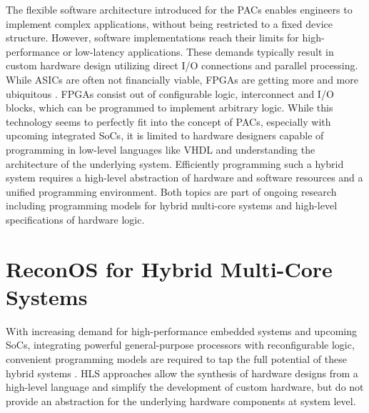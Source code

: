 The flexible software architecture introduced for the \acp{PAC} enables
engineers to implement complex applications, without being restricted to a
fixed device structure. However, software implementations reach their limits
for high-performance or low-latency applications. These demands typically
result in custom hardware design utilizing direct I/O connections and parallel
processing. While \acp{ASIC} are often not financially viable, \acp{FPGA} are
getting more and more ubiquitous \citep{VMB13}. \acp{FPGA} consist out of
configurable logic, interconnect and I/O blocks, which can be programmed to
implement arbitrary logic. While this technology seems to perfectly fit into
the concept of \acp{PAC}, especially with upcoming integrated \acp{SoC}, it is
limited to hardware designers capable of programming in low-level languages
like \ac{VHDL} and understanding the architecture of the underlying system.
Efficiently programming such a hybrid system requires a high-level abstraction
of hardware and software resources \citep{ANA04} and a unified programming
environment. Both topics are part of ongoing research including programming
models for hybrid multi-core systems and high-level specifications of hardware
logic.

\section{ReconOS for Hybrid Multi-Core Systems}
With increasing demand for high-performance embedded systems and upcoming
\acp{SoC}, integrating powerful general-purpose processors with reconfigurable
logic, convenient programming models are required to tap the full potential of
these hybrid systems \citep{ANA04,VMB13}. \ac{HLS} approaches allow the
synthesis of hardware designs from a high-level language and simplify the
development of custom hardware, but do not provide an abstraction for the
underlying hardware components at system level.

